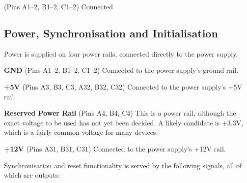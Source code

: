 \begin{description}
\li{} (Pins A1–2, B1–2, C1–2) Connected
\end{description}







\subsection{Power, Synchronisation and Initialisation}
\label{sec-bus-power-clock-reset}

Power is supplied on four power rails, connected directly to the power
supply.

\begin{description}
\item{\bfseries GND} (Pins A1–2, B1–2, C1–2) Connected
  to the power supply's ground rail.
\item{\bfseries +5V} (Pins A3, B3, C3, A32, B32, C32) Connected to the power supply's +5V rail.
\item{\bfseries Reserved Power Rail} (Pins A4, B4, C4) This is a power rail,
  although the exact voltage to be used has not yet been decided. A
  likely candidate is +3.3V, which is a fairly common voltage for many
  devices.
\item{\bfseries +12V} (Pins A31, B31, C31) Connected to the power supply's
  +12V rail.
\end{description}

Synchronisation and reset functionality is served by the following
signals, all of which are outputs:

